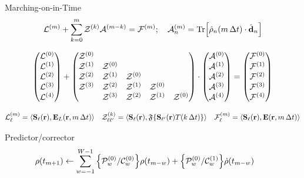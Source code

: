 \documentclass[aspectratio=169]{beamer}
\newcommand{\oper}[1]{\mathcal{#1}}
\begin{document}
\begin{frame}
  \begin{block}{Marching-on-in-Time}
    \begin{equation*}
    \oper{L}^{(m)} + \sum_{k = 0}^m \oper{Z}^{(k)} \oper{A}^{(m-k)} = \oper{F}^{(m)}; \quad \oper{A}^{(m)}_n = \Trace\!\qty[\hat{\rho}_n(m \, \Delta t) \cdot \hat{\vb{d}}_n]
    \end{equation*}
  \end{block}

  \vspace{-0.5cm}
  \begin{equation*}
    \mqty(\oper{L}^{(0)} \\ \oper{L}^{(1)} \\ \oper{L}^{(2)} \\ \oper{L}^{(3)} \\ \oper{L}^{(4)}) +
    \mqty(
      \oper{Z}^{(0)} \\
      \oper{Z}^{(1)} & \oper{Z}^{(0)} \\
      \oper{Z}^{(2)} & \oper{Z}^{(1)} & \oper{Z}^{(0)} \\
      \oper{Z}^{(3)} & \oper{Z}^{(2)} & \oper{Z}^{(1)} & \oper{Z}^{(0)} \\
                                & \oper{Z}^{(3)} & \oper{Z}^{(2)} & \oper{Z}^{(1)} & \oper{Z}^{(0)} \\
    ) \cdot
    \mqty(\oper{A}^{(0)} \\ \oper{A}^{(1)} \\ \oper{A}^{(2)} \\ \oper{A}^{(3)} \\ \oper{A}^{(4)}) =
    \mqty(\oper{F}^{(0)} \\ \oper{F}^{(1)} \\ \oper{F}^{(2)} \\ \oper{F}^{(3)} \\ \oper{F}^{(4)})
  \end{equation*}

  \vspace{-0.5cm}
  \begin{equation*}
    \oper{L}^{(m)}_\ell = \langle\vb{S}_\ell(\vb{r}), \vb{E}_L (\vb{r}, m\, \Delta t)\rangle \quad
    \oper{Z}^{(k)}_{\ell\ell'} = \langle\vb{S}_\ell(\vb{r}), \mathfrak{F}\qty{\vb{S}_{\ell'}(\vb{r})T(k \, \Delta t)}\rangle \quad
    \oper{F}^{(m)}_\ell = \langle\vb{S}_\ell(\vb{r}), \vb{E} (\vb{r}, m\, \Delta t)\rangle
  \end{equation*}

  \begin{block}{Predictor/corrector}
    \begin{equation*}
      \rho(t_{m + 1}) \leftarrow \sum_{w = {-1}}^{W - 1} \qty{\mathcal{P}_{w}^{(0)} / \mathcal{C}_{w}^{(0)}} \rho(t_{m-w}) + \qty{\mathcal{P}_{w}^{(0)}/ \mathcal{C}_{w}^{(1)}} \dot{\rho}(t_{m - w}) \qquad
    \end{equation*}
  \end{block}
\end{frame}
\end{document}
